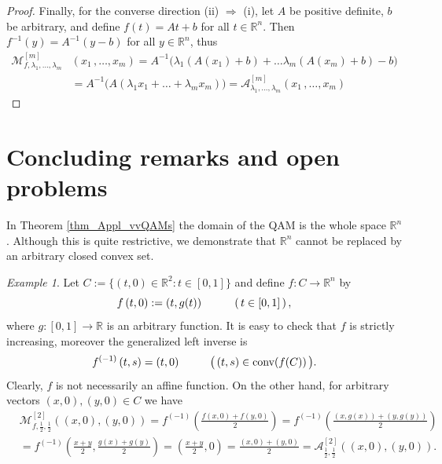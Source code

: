 \documentclass[12pt]{amsart}
\theoremstyle{remark}
\newtheorem{exmp}{Example}%
\theoremstyle{definition}
\newcommand{\RR}{\mathbb{R}}
\newcommand{\Rn}{\mathbb{R}^n}
\newcommand{\conv}{\mbox{\rm conv}}
\newcommand{\map}{\longrightarrow}
\begin{document}
\begin{proof}
Finally, for the converse direction 
(ii) $ \Longrightarrow $ (i), 
let $ A $ be positive definite, $ b $ be arbitrary, 
and define $ f(t) = At+b $ for all $ t \in \Rn $. Then 
$ f^{-1}(y) = A^{-1}(y-b) $ for all $ y \in \Rn $, thus 
\begin{align*}
\mathcal{M}_{f, \lambda_1 , \dots , \lambda_m}^{[m]} 
& \left( x_1 \,, \dots , x_m \right)
= A^{-1} \bigl( \lambda_1 \left( A(x_1) + b \right) + 
\dots \lambda_m \left( A(x_m) + b \right) - b \bigr) \\  
& = 
A^{-1} \bigl( A \left( 
\lambda_1 x_1 + \dots + \lambda_m x_m \right) \bigr) = 
\mathcal{A}_{\lambda_1 , \dots , \lambda_m}^{[m]} 
\left( x_1 \,, \dots , x_m \right) 
\end{align*}
\end{proof}

\section{Concluding remarks and open problems} 

In Theorem \ref{thm_Appl_vvQAMs} the domain of the 
QAM is the whole space $ \Rn $. Although this is quite 
restrictive, we demonstrate that $ \Rn $ 
cannot be replaced by an arbitrary closed convex set. 

\begin{exmp}
Let 
$ C := \lbrace (t,0) \in \RR^2 : t \in [0,1] \rbrace $ 
and define $ f : C \map \Rn $ by 
\[
f \left( t,0 \right) := \left( t, g(t) \right) 
\hspace{10mm} 
\left( \, t \in [0,1] \, \right), 
\]
where $ g : [0,1] \map \RR $ is an arbitrary function. 
It is easy to check that $ f $ is strictly 
increasing, moreover the generalized left inverse is 
\[
f^{(-1)} \left( t,s \right) = (t,0) 
\hspace{10mm} 
\bigl( \, (t,s) \in \conv(f(C)) \, \bigr). 
\]
Clearly, $ f $ is not necessarily an affine function. 
On the other hand, for arbitrary vectors 
$ (x,0), (y,0) \in C $ we have 
\begin{align*}
& \mathcal{M}_{f,\frac{1}{2}, \frac{1}{2}}^{[2]} 
\left( (x,0),(y,0) \right) =  
f^{(-1)} \left( \frac{f(x,0)+f(y,0)}{2} \right) =  
f^{(-1)} \left( \frac{(x,g(x))+(y,g(y))}{2} \right) \\ 
& = 
f^{(-1)} \left( \frac{x+y}{2} , \frac{g(x)+g(y)}{2} \right) 
= \left( \frac{x+y}{2} , 0 \right) = 
\frac{(x,0) + (y,0)}{2} = 
\mathcal{A}_{\frac{1}{2}, \frac{1}{2}}^{[2]} 
\left( (x,0),(y,0) \right).
\end{align*}
\end{exmp}
\end{document}
